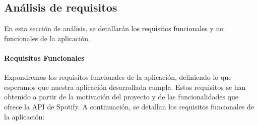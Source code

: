 \subsection{Análisis de requisitos\label{SEC:REQUISITOS}}

En esta sección de análisis, se detallarán los requisitos funcionales y no funcionales de la aplicación.

\paragraph{\textbf{Requisitos Funcionales}}

Expondremos los requisitos funcionales de la aplicación, definiendo lo que esperamos que nuestra aplicación desarrollada 
cumpla. Estos requisitos se han obtenido a partir de la motivación del proyecto y de las funcionalidades que ofrece la API
de Spotify. A continuación, se detallan los requisitos funcionales de la aplicación:


